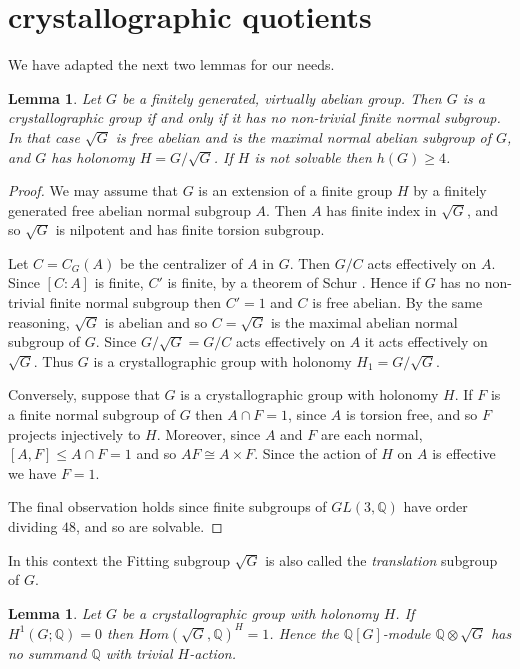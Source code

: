 \documentclass[12pt]{amsart}
\renewcommand{\geq}{\geqslant}
\renewcommand{\leq}{\leqslant}
\newtheorem{lemma}[theorem]{Lemma}
\begin{document}
\section{crystallographic quotients}

We have adapted the next two lemmas for our needs.

\begin{lemma}
\label{crys}
\cite[Theorem 2.2]{Sz}
Let $G$ be a finitely generated, virtually abelian group.
Then $G$ is a crystallographic group if and only if it has no non-trivial finite normal subgroup.
In that case $\sqrt{G}$ is  free abelian and is
the maximal normal abelian subgroup of $G$,
and $G$ has holonomy $H=G/\sqrt{G}$.
If $H$ is not solvable then $h(G)\geq4$.
\end{lemma}

\begin{proof}
We may assume that $G$ is an extension of a finite group $H$ 
by a finitely generated free abelian normal subgroup $A$.
Then $A$ has finite index in $\sqrt{G}$, 
and so $\sqrt{G}$ is nilpotent and has finite torsion subgroup.

Let $C=C_G(A)$ be the centralizer of $A$ in $G$.
Then $G/C$ acts effectively on $A$.
Since $[C:A]$ is finite, $C'$ is finite,
by a theorem of Schur \cite[10.1.4]{Ro}.
Hence if $G$ has no non-trivial finite normal subgroup then
$C'=1$ and $C$ is free abelian.
By the same reasoning, $\sqrt{G}$ is abelian and so $C=\sqrt{G}$
is the maximal abelian normal subgroup of $G$.
Since $G/\sqrt{G}=G/C$ acts effectively on $A$ it acts effectively on $\sqrt{G}$.
Thus $G$ is a crystallographic group with holonomy $H_1=G/\sqrt{G}$.

Conversely,  suppose that $G$ is a crystallographic group with holonomy $H$.
If $F$ is a finite normal subgroup of $G$ then $A\cap{F}=1$,
since $A$ is torsion free, and so $F$ projects injectively to $H$.
Moreover, since $A$ and $F$ are each normal,
$[A,F]\leq{A}\cap{F}=1$ and so $AF\cong{A}\times{F}$.
Since the action of $H$ on $A$ is effective 
we have $F=1$.

The final observation holds since finite subgroups of 
$GL(3,\mathbb{Q})$ have order dividing $48$, 
and so  are solvable.
\end{proof}

In this context the Fitting subgroup $\sqrt{G}$ is also called the 
{\it translation\/} subgroup of $G$.

\begin{lemma}
\label{HS?}
\cite[Prop.  4.1]{Sz}
Let $G$ be a crystallographic group with holonomy $H$.
If $H^1(G;\mathbb{Q})=0$ then ${Hom(\sqrt{G},\mathbb{Q})}^H=1$.
Hence the $\mathbb{Q}[G]$-module $\mathbb{Q}\otimes\sqrt{G}$
has no summand $\mathbb{Q}$ with trivial $H$-action.
\end{lemma}
\end{document}
